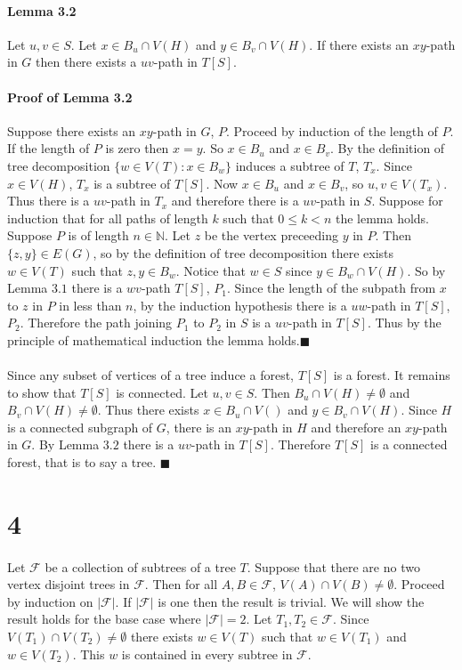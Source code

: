 \documentclass[letterpaper,12pt,oneside,onecolumn]{report}
\begin{document}
\paragraph{Lemma 3.2}
Let $u, v \in S$. Let $x \in B_u \cap V(H)$ and $y \in B_v \cap V(H)$. If there exists an $xy$-path in $G$ then there exists a $uv$-path in $T[S]$.
\paragraph{Proof of Lemma 3.2}
Suppose there exists an $xy$-path in $G$, $P$. Proceed by induction of the length of $P$. If the length of $P$ is zero then $x=y$. So $x \in B_u$ and $x \in B_v$. By the definition of tree decomposition $\{w \in V(T) : x \in B_w \}$ induces a subtree of $T$, $T_x$. Since $x \in V(H)$, $T_x$ is a subtree of $T[S]$. Now $x \in B_u$ and $x \in B_v$, so $u, v \in V(T_x)$. Thus there is a $uv$-path in $T_x$ and therefore there is a $uv$-path in $S$. Suppose for induction that for all paths of length $k$ such that $0\leq k < n$ the lemma holds. Suppose $P$ is of length $n \in \mathbb{N}$. Let $z$ be the vertex preceeding $y$ in $P$. Then $\{z,y\} \in E(G)$, so by the definition of tree decomposition there exists $w \in V(T)$ such that $z,y \in B_w$. Notice that $w \in S$ since $y \in B_w \cap V(H)$. So by Lemma $3.1$ there is a $wv$-path $T[S]$, $P_1$. Since the length of the subpath from $x$ to $z$ in $P$ in less than $n$, by the induction hypothesis there is a $uw$-path in $T[S]$, $P_2$. Therefore the path joining $P_1$ to $P_2$ in $S$ is a $uv$-path in $T[S]$. Thus by the principle of mathematical induction the lemma holds.$\blacksquare$
\paragraph{}
Since any subset of vertices of a tree induce a forest, $T[S]$ is a forest. It remains to show that $T[S]$ is connected. Let $u,v \in S$. Then $B_u \cap V(H) \neq \emptyset$ and $B_v \cap V(H) \neq \emptyset$. Thus there exists $x \in B_u \cap V()$ and $y \in B_v \cap V(H)$. Since $H$ is a connected subgraph of $G$, there is an $xy$-path in $H$ and therefore an $xy$-path in $G$. By Lemma $3.2$ there is a $uv$-path in $T[S]$. Therefore $T[S]$ is a connected forest, that is to say a tree. $\blacksquare$
\section*{4}
\paragraph{}
Let $\mathcal{F}$ be a collection of subtrees of a tree $T$. Suppose that there are no two vertex disjoint trees in $\mathcal{F}$. Then for all $A, B \in \mathcal{F}$, $V(A) \cap V(B) \neq \emptyset$. Proceed by induction on $|\mathcal{F}|$. If $|\mathcal{F}|$ is one then the result is trivial. We will show the result holds for the base case where $|\mathcal{F}| = 2$. Let $T_1, T_2 \in \mathcal{F}$. Since $V(T_1) \cap V(T_2) \neq \emptyset$ there exists $w \in V(T)$ such that $w \in V(T_1)$ and $w \in V(T_2)$. This $w$ is contained in every subtree in $\mathcal{F}$.
\end{document}
